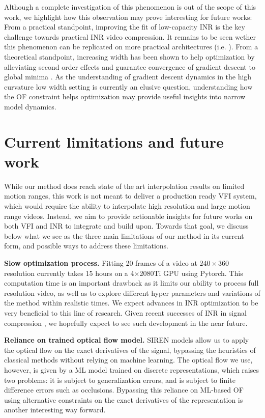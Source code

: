 \documentclass{article}
\begin{document}
Although a complete investigation of this phenomenon is out of the scope of this work,
we highlight how this observation may prove interesting for future works:
From a practical standpoint, improving the fit of low-capacity INR
is the key challenge towards practical INR video compression.
It remains to be seen wether this phenomenon can be replicated on more practical architectures (i.e. \cite{chen2021nerv}).
From a theoretical standpoint, increasing width has been shown to help
optimization by alleviating second order effects \cite{liu2020linearity}
and guarantee convergence of gradient descent to global minima \cite{du2018gradient}.
As the understanding of gradient descent dynamics in the high curvature low width setting
is currently an elusive question, understanding how the OF constraint
helps optimization may provide useful insights into narrow model dynamics.

\section{Current limitations and future work}
\label{sec_lim}

While our method does reach state of the art interpolation results on limited motion ranges,
this work is not meant to deliver a production ready VFI system,
which would require the ability to interpolate high resolution and large motion range videos.
Instead, we aim to provide actionable insights for future works on both VFI and INR to integrate and build upon.
Towards that goal, we discuss below what we see as the three main limitations of our method in its current form,
and possible ways to address these limitations.

\textbf{Slow optimization process.}
Fitting 20 frames of a video at $240 \times 360$ resolution currently takes 15 hours on a 4$\times$2080Ti GPU using Pytorch.
This computation time is an important drawback as it limits our ability to process full resolution video,
as well as to explore different hyper parameters and variations of the method within realistic times.
We expect advances in INR optimization to be very beneficial to this line of research.
Given recent successes of INR in signal compression \cite{zhang2021implicit}\cite{dupont2021coin} \cite{dupont2022coin++} \cite{park2019deepsdf} \cite{mescheder2019occupancy} \cite{chen2021nerv},
we hopefully expect to see such development in the near future.

\textbf{Reliance on trained optical flow model.}
SIREN models allow us to apply the optical flow on the exact derivatives of the signal,
bypassing the heuristics of classical methods without relying on machine learning.
The optical flow we use, however, is given by a ML model trained on discrete representations, which raises two problems:
it is subject to generalization errors,
and is subject to finite difference errors such as occlusions.
Bypassing this reliance on ML-based OF using alternative constraints on the exact derivatives
of the representation is another interesting way forward.
\end{document}
